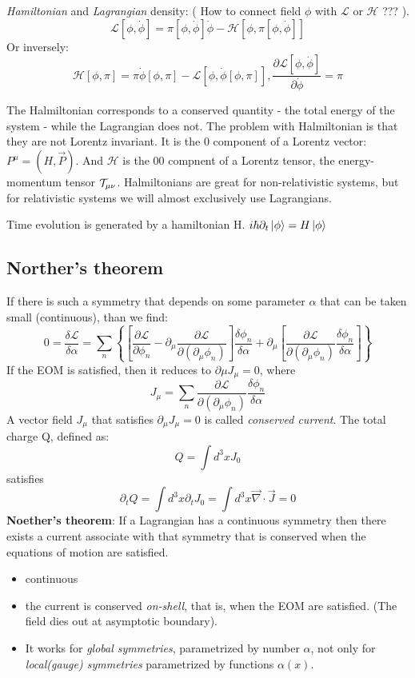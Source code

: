 \emph{Hamiltonian} and \emph{Lagrangian} density: ( How to connect field
$\phi$ with $\mathcal{L}$ or $\mathcal{H}$ ??? ).
\[ \mathcal{L}[\phi,\dot{\phi}] = \pi[\phi, \dot{\phi}]\dot{\phi} -
\mathcal{H}[\phi, \pi[\phi, \dot{\phi}]]  \]
Or inversely:
\[ \mathcal{H}[\phi,\pi] = \pi\dot{\phi}[\phi, \pi] -
\mathcal{L}[\phi, \dot{\phi}[\phi, \pi]],   
\frac{\partial \mathcal{L}[\phi, \dot{\phi}]}{\partial \dot{\phi} } = \pi\]

The Halmiltonian corresponds to a conserved quantity - the total energy of
the system - while the Lagrangian does not. The problem with Halmiltonian is
that they are not Lorentz invariant. It is the 0 component of a Lorentz
vector: $P^\mu = (H, \vec{P})$. And $\mathcal{H}$ is the 00 compnent of a
Lorentz tensor, the energy-momentum tensor $\mathcal{T}_{\mu\nu}$. Halmiltonians
are great for non-relativistic systems, but for relativistic systems we will
almost exclusively use Lagrangians.

Time evolution is generated by a hamiltonian H.
$i\hbar\partial_{t}\ket{\phi} = H\ket{\phi}$

\subsection{Norther's theorem}
If there is such a symmetry that depends on some parameter $\alpha$ that can
be taken small (continuous), than we find:
\[ 0 = \frac{\delta\mathcal{L}}{\delta\alpha} =
\displaystyle\sum_n\left\{ \left[\frac{\partial\mathcal{L}}{\partial{\phi_n}} - 
\partial_\mu\frac{\partial\mathcal{L}}{\partial(\partial_\mu\phi_n)}\right]\frac{\delta\phi_n}{\delta\alpha} 
+
\partial_\mu\left[\frac{\partial\mathcal{L}}{\partial(\partial_\mu\phi_n)}\frac{\delta\phi_n}{\delta\alpha}\right]
\right\} \]
If the EOM is satisfied, then it reduces to $\partial\mu J_\mu = 0$, where 
\begin{equation}
    \label{Norther current}
    J_\mu =
    \displaystyle\sum_n\frac{\partial\mathcal{L}}{\partial(\partial_\mu\phi_n)}\frac{\delta\phi_n}{\delta\alpha}
\end{equation}
A vector field $J_\mu$ that satisfies $\partial_\mu J_\mu = 0$ is called
\emph{conserved current}. The total charge Q, defined as: 
\[ Q = \int d^3xJ_0 \]
satisfies 
\[ \partial_{t}Q = \int d^3x\partial_{t}J_0 = \int
d^3x\vec{\nabla}\cdot\vec{J} = 0 \]
\textbf{Noether's theorem}: If a Lagrangian has a continuous symmetry then
there exists a current associate with that symmetry that is conserved when
the equations of motion are satisfied.
\begin{itemize}
    \item continuous
    \item the current is conserved \textit{on-shell}, that is, when the EOM
	are satisfied. (The field dies out at asymptotic boundary).
    \item It works for \textit{global symmetries}, parametrized by number
	$\alpha$, not only for \textit{local(gauge) symmetries} parametrized
	by functions $\alpha(x)$.
\end{itemize}

